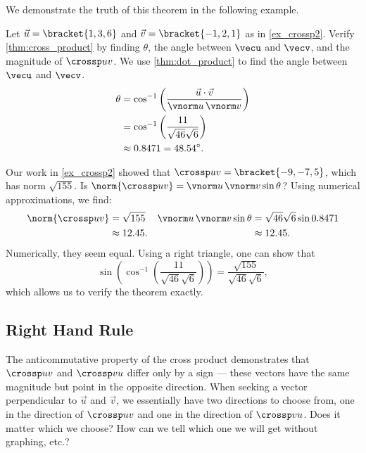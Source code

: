 We demonstrate the truth of this theorem in the following example.

\begin{example}\label{ex_crossp3}
Let $\vec u =\bracket{1,3,6}$ and $\vec v = \bracket{-1,2,1}$ as in \autoref{ex_crossp2}. Verify \autoref{thm:cross_product} by finding $\theta$, the angle between $\vecu$ and $\vecv$, and the magnitude of $\crossp uv$.
\solution
We use \autoref{thm:dot_product} to find the angle between $\vecu$ and $\vecv$. 
\begin{align*}
\theta &= \cos^{-1}\left(\frac{\vec u\cdot\vec v}{\vnorm u\, \vnorm v}\right) \\
			&= \cos^{-1}\left(\frac{11}{\sqrt{46}\sqrt{6}}\right)\\
			&\approx 0.8471 = 48.54^\circ.
\end{align*}

Our work in \autoref{ex_crossp2} showed that $\crossp uv = \bracket{-9,-7,5}$, which has norm $\sqrt{155}.$ Is $\norm{\crossp uv} = \vnorm u\, \vnorm v\sin\theta$? Using numerical approximations, we find:
\begin{align*}
\norm{\crossp uv}
 &=\sqrt{155}  & \vnorm u\,\vnorm v \sin\theta & = \sqrt{46}\sqrt{6}\sin 0.8471\\
 &\approx 12.45. & &\approx 12.45.
\end{align*}
Numerically, they seem equal. Using a right triangle, one can show that 
\[\sin\left(\cos^{-1}\left(\frac{11}{\sqrt{46}\sqrt{6}}\right)\right) = \frac{\sqrt{155}}{\sqrt{46}\sqrt{6}},\]
which allows us to verify the theorem exactly.
\end{example}

\subsection{Right Hand Rule}

The anticommutative property of the cross product demonstrates that $\crossp uv$ and $\crossp vu$ differ only by a sign --- these vectors have the same magnitude but point in the opposite direction. When seeking a vector perpendicular to $\vec u$ and $\vec v$, we essentially have two directions to choose from, one in the direction of $\crossp uv$ and one in the direction of $\crossp vu$. Does it matter which we choose? How can we tell which one we will get without graphing, etc.?


